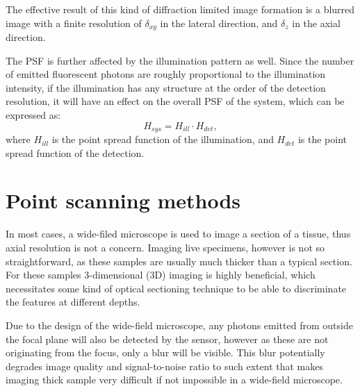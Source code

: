     The effective result of this kind of diffraction limited image formation is a blurred image with a finite resolution of $\delta_{xy}$ in the lateral direction, and $\delta_z$ in the axial direction.

    The PSF is further affected by the illumination pattern as well. Since the number of emitted fluorescent photons are roughly proportional to the illumination intensity, if the illumination has any structure at the order of the detection resolution, it will have an effect on the overall PSF of the system, which can be expressed as:
    \begin{equation}
      H_{sys} = H_{ill} \cdot H_{det},
      \label{eq:systemPSF}
    \end{equation}
    where $H_{ill}$ is the point spread function of the illumination, and $H_{det}$ is the point spread function of the detection.



\section{Point scanning methods}
  In most cases, a wide-filed microscope is used to image a section of a tissue, thus axial resolution is not a concern. Imaging live specimens, however is not so straightforward, as these samples are usually much thicker than a typical section. For these samples 3-dimensional (3D) imaging is highly beneficial, which necessitates some kind of optical sectioning technique to be able to discriminate the features at different depths.


  Due to the design of the wide-field microscope, any photons emitted from outside the focal plane will also be detected by the sensor, however as these are not originating from the focus, only a blur will be visible. This blur potentially degrades image quality and signal-to-noise ratio to such extent that makes imaging thick sample very difficult if not impossible in a wide-field microscope. 


